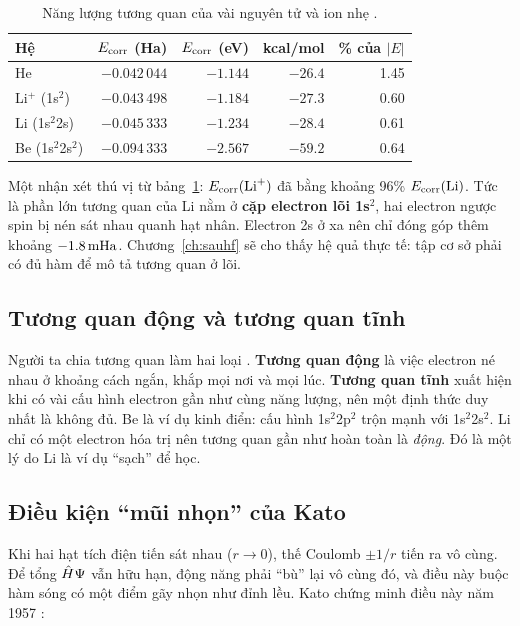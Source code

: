 \begin{table}[h]
\centering\small
\caption{Năng lượng tương quan của vài nguyên tử và ion nhẹ \cite{King2018,KogaThakkar1996,Wang2012,Hornyak2019}.}
\label{tab:ecorr}
\begin{tabular}{@{}lrrrr@{}}
\toprule
Hệ & $E_{\mathrm{corr}}$ (Ha) & $E_{\mathrm{corr}}$ (eV) & kcal/mol & \% của $|E|$ \\
\midrule
He & $-0.042\,044$ & $-1.144$ & $-26.4$ & 1.45 \\
Li$^+$ (1s$^2$) & $-0.043\,498$ & $-1.184$ & $-27.3$ & 0.60 \\
Li (1s$^2$2s) & $-0.045\,333$ & $-1.234$ & $-28.4$ & 0.61 \\
Be (1s$^2$2s$^2$) & $-0.094\,333$ & $-2.567$ & $-59.2$ & 0.64 \\
\bottomrule
\end{tabular}
\end{table}

Một nhận xét thú vị từ bảng~\ref{tab:ecorr}: $E_{\mathrm{corr}}(\text{Li}^+)$ đã bằng khoảng 96\% $E_{\mathrm{corr}}(\text{Li})$. Tức là phần lớn tương quan của Li nằm ở \textbf{cặp electron lõi 1s$^2$}, hai electron ngược spin bị nén sát nhau quanh hạt nhân. Electron 2s ở xa nên chỉ đóng góp thêm khoảng $-1.8\,\mathrm{mHa}$. Chương~\ref{ch:sauhf} sẽ cho thấy hệ quả thực tế: tập cơ sở phải có đủ hàm để mô tả tương quan ở lõi.

\subsection{Tương quan động và tương quan tĩnh}
Người ta chia tương quan làm hai loại \cite{HollettGill2011}. \textbf{Tương quan động}  là việc electron né nhau ở khoảng cách ngắn, khắp mọi nơi và mọi lúc. \textbf{Tương quan tĩnh}  xuất hiện khi có vài cấu hình electron gần như cùng năng lượng, nên một định thức duy nhất là không đủ. Be là ví dụ kinh điển: cấu hình 1s$^2$2p$^2$ trộn mạnh với 1s$^2$2s$^2$. Li chỉ có một electron hóa trị nên tương quan gần như hoàn toàn là \emph{động}. Đó là một lý do Li là ví dụ ``sạch'' để học.

\subsection{Điều kiện ``mũi nhọn'' của Kato}\label{sec:cusp}
Khi hai hạt tích điện tiến sát nhau ($r\to0$), thế Coulomb $\pm1/r$ tiến ra vô cùng. Để tổng $\hat H\Psi$ vẫn hữu hạn, động năng phải ``bù'' lại vô cùng đó, và điều này buộc hàm sóng có một điểm gãy nhọn như đỉnh lều. Kato chứng minh điều này năm 1957 \cite{Kato1957}:

